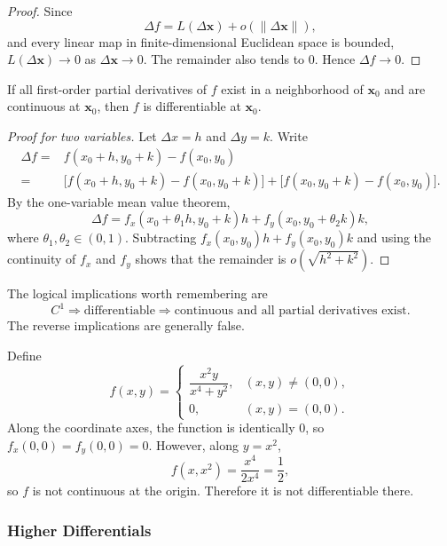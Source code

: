 \begin{proof}
Since
\[
    \Delta f=L(\Delta\mathbf{x})+o(\|\Delta\mathbf{x}\|),
\]
and every linear map in finite-dimensional Euclidean space is bounded, $L(\Delta\mathbf{x})\to0$ as $\Delta\mathbf{x}\to0$. The remainder also tends to $0$. Hence $\Delta f\to0$.
\end{proof}

\begin{theorem}
If all first-order partial derivatives of $f$ exist in a neighborhood of $\mathbf{x}_0$ and are continuous at $\mathbf{x}_0$, then $f$ is differentiable at $\mathbf{x}_0$.
\end{theorem}

\begin{proof}[Proof for two variables]
Let $\Delta x=h$ and $\Delta y=k$. Write
\[
\begin{aligned}
\Delta f={}&f(x_0+h,y_0+k)-f(x_0,y_0)\\
={}&\bigl[f(x_0+h,y_0+k)-f(x_0,y_0+k)\bigr]
+\bigl[f(x_0,y_0+k)-f(x_0,y_0)\bigr].
\end{aligned}
\]
By the one-variable mean value theorem,
\[
    \Delta f=f_x(x_0+\theta_1 h,y_0+k)h+f_y(x_0,y_0+\theta_2 k)k,
\]
where $\theta_1,\theta_2\in(0,1)$. Subtracting $f_x(x_0,y_0)h+f_y(x_0,y_0)k$ and using the continuity of $f_x$ and $f_y$ shows that the remainder is $o(\sqrt{h^2+k^2})$.
\end{proof}

\begin{note}
The logical implications worth remembering are
\[
    C^1 \Longrightarrow \text{differentiable} \Longrightarrow \text{continuous and all partial derivatives exist}.
\]
The reverse implications are generally false.
\end{note}

\begin{example}
Define
\[
    f(x,y)=
    \begin{cases}
    \dfrac{x^2y}{x^4+y^2}, & (x,y)\ne(0,0),\\[6pt]
    0, & (x,y)=(0,0).
    \end{cases}
\]
Along the coordinate axes, the function is identically $0$, so $f_x(0,0)=f_y(0,0)=0$. However, along $y=x^2$,
\[
    f(x,x^2)=\frac{x^4}{2x^4}=\frac12,
\]
so $f$ is not continuous at the origin. Therefore it is not differentiable there.
\end{example}

\subsubsection{Higher Differentials}


